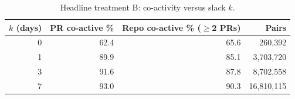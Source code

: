 \begin{table}[t]
\centering
\caption{Headline treatment B: co-activity versus slack $k$.}
\label{tab:ksweep}
\begin{tabular}{r r r r}
\hline
$k$ (days) & PR co-active \% & Repo co-active \% ($\ge$2 PRs) & Pairs \\
\hline
0 & 62.4 & 65.6 & 260,392 \\
1 & 89.9 & 85.1 & 3,703,720 \\
3 & 91.6 & 87.8 & 8,702,558 \\
7 & 93.0 & 90.3 & 16,810,115 \\
\hline
\end{tabular}
\end{table}

